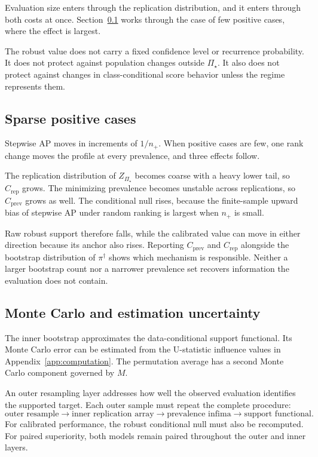 \documentclass[11pt]{article}
\newcommand{\PSet}{\Pi_\star}
\theoremstyle{remark}
\begin{document}
Evaluation size enters through the replication distribution, and it enters through both costs at once. Section~\ref{sec:sparse} works through the case of few positive cases, where the effect is largest.

The robust value does not carry a fixed confidence level or recurrence probability. It does not protect against population changes outside $\PSet$. It also does not protect against changes in class-conditional score behavior unless the regime represents them.

\subsection{Sparse positive cases}
\label{sec:sparse}

Stepwise AP moves in increments of $1/n_+$. When positive cases are few, one rank change moves the profile at every prevalence, and three effects follow.

The replication distribution of $Z_{\PSet}$ becomes coarse with a heavy lower tail, so $C_{\mathrm{rep}}$ grows. The minimizing prevalence becomes unstable across replications, so $C_{\mathrm{prev}}$ grows as well. The conditional null rises, because the finite-sample upward bias of stepwise AP under random ranking is largest when $n_+$ is small.

Raw robust support therefore falls, while the calibrated value can move in either direction because its anchor also rises. Reporting $C_{\mathrm{prev}}$ and $C_{\mathrm{rep}}$ alongside the bootstrap distribution of $\pi^\dagger$ shows which mechanism is responsible. Neither a larger bootstrap count nor a narrower prevalence set recovers information the evaluation does not contain.

\subsection{Monte Carlo and estimation uncertainty}

The inner bootstrap approximates the data-conditional support functional. Its Monte Carlo error can be estimated from the U-statistic influence values in Appendix~\ref{app:computation}. The permutation average has a second Monte Carlo component governed by $M$.

An outer resampling layer addresses how well the observed evaluation identifies the supported target. Each outer sample must repeat the complete procedure:
\[
\text{outer resample}
\longrightarrow
\text{inner replication array}
\longrightarrow
\text{prevalence infima}
\longrightarrow
\text{support functional}.
\]
For calibrated performance, the robust conditional null must also be recomputed. For paired superiority, both models remain paired throughout the outer and inner layers.
\end{document}

